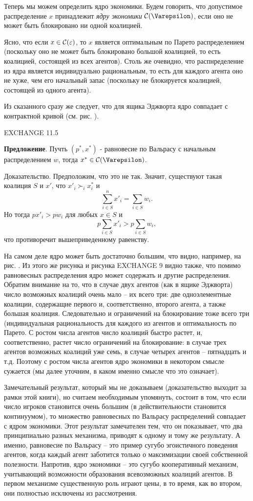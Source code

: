 Теперь мы можем определить ядро экономики. Будем говорить, что допустимое распределение $x$
принадлежит \emph{ядру экономики \Varepsilon}  ${\cal C}(\Varepsilon )$, если оно не
может быть блокировано ни одной коалицией.

Ясно, что если $x\in {\cal
C}(\varepsilon )$, то $x$ является оптимальным по Парето распределением
(поскольку оно не может быть блокировано большой коалицией, то есть коалицией,
состоящей из всех агентов). Столь же очевидно, что распнределение из ядра
является индивидуально рациональным, то есть для каждого агента оно не хуже, чем
его начальный запас (поскольку не блокируется коалицией, состоящей из одного агента).

Из сказанного сразу же следует, что для ящика Эджворта ядро совпадает с контрактной кривой
(см. рис.    ).

EXCHANGE 11.5

{\bf Предложение}. Пучть $(p^*,x^*)$ -  равновесие по Вальрасу с
начальным распределением $w$, тогда $x^*\in {\cal C}(\Varepsilon )$.

Доказательство. Предположим, что это не так. Значит, существуют такая коалиция $S$
и $x'$, что $x'_i\succ_i x^*_i$ и
$$
\sum^n_{i\in S}x'_i=\sum_{i\in S}w_i.
$$
Но тогда $px'_i>pw_i$ для любых $x\in S$ и
$$
p\sum_{i\in S}x'_i>p\sum_{i\in S}w_i,
$$
что противоречит вышеприведенному равенству.

На самом деле ядро может быть достаточно большим, что видно, например, на рис.   .
Из этого же рисунка и рисунка EXCHANGE 9 видно также, что помимо равновесных
распределения ядро может содержать и другие распределения. Обратим внимание на то, что
в случае двух агентов (как в ящике Эджворта) число возможных коалиций очень мало -- их
всего три: две одноэлементные коалиции, содержащие первого и, соответственно, второго
агента, а также большая коалиция. Следовательно и ограничений на блокирование тоже всего три
(индивидуальная рациональность для каждого из агентов и оптимальность по Парето.
С ростом числа агентов число коалиций быстро растет, и, соответственно, растет число
ограничений на блокирование: в случае трех агентов возможных коалиций уже семь, в случае
четырех агентов -- пятнадцать и т.д. Поэтому с ростом числа агентов ядро экономики в некотором
смысле сужается (мы далее уточним, в каком именно смысле
что это означает).

Замечательный результат, который мы не доказываем (доказательство выходит за рамки
этой книги), но считаем необходимым
упомянуть, состоит в том, что если число игроков становится очень большим (в действительности
становится континуумом), то множество равновесных по Вальрасу распределений
совпадает с ядром экономики. Этот результат замечателен тем, что он показывает,
что два принципиально разных механизма, приводят к одному и тому же результату.
А именно, равновесие по Вальрасу -- это пример сугубо эгоистичного поведения агентов,
когда каждый агент заботится только о максимизации своей собственной полезности.
Напротив, ядро экономики -- это сугубо кооперативный механизм, учитывающий
возможности образования всевозможных коалиций агентов. В первом механизме
существенную роль играют цены, в то время, как во втором, они полностью исключены
из рассмотрения.

